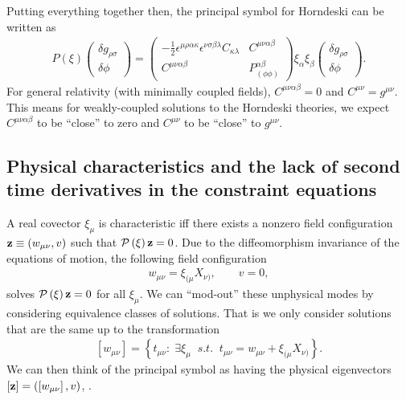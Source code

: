 \documentclass{ws-ijmpd}
\begin{document}
Putting everything together then, the principal symbol for Horndeski
can be written as
\begin{align}
   P\left(\xi\right)
   \begin{pmatrix}
      \delta g_{\rho\sigma}
      \\
      \delta\phi
   \end{pmatrix}
   =
   \begin{pmatrix}
      -
      \frac{1}{2}
      \epsilon^{\mu\rho\alpha\kappa}
      \epsilon^{\nu\sigma\beta\lambda}
      C_{\kappa\lambda}
      &
      C^{\mu\nu\alpha\beta}
      \\
      C^{\mu\nu\alpha\beta}
      &
      P^{\alpha\beta}_{(\phi\phi)}
   \end{pmatrix}
   \xi_{\alpha}\xi_{\beta}
   \begin{pmatrix}
      \delta g_{\rho\sigma}
      \\
      \delta\phi
   \end{pmatrix}
   .
\end{align}
For general relativity (with minimally coupled fields),
$C^{\mu\nu\alpha\beta}=0$ and $C^{\mu\nu}=g^{\mu\nu}$. 
This means for weakly-coupled solutions to the Horndeski theories,
we expect $C^{\mu\nu\alpha\beta}$ to be ``close'' to zero
and $C^{\mu\nu}$ to be ``close'' to $g^{\mu\nu}$.
\subsection{Physical characteristics and the lack of
second time derivatives in the constraint equations
\label{sec:physical_characteristics}}
A real covector $\xi_{\mu}$ is characteristic iff there exists a
nonzero field configuration ${\bf z}\equiv(w_{\mu\nu},v)$ such that
$\mathcal{P}\left(\xi\right){\bf z}=0$.
Due to the diffeomorphism invariance of the equations of motion,
the following field configuration
\begin{align}
   w_{\mu\nu}
   =
   \xi_{(\mu}X_{\nu)}
   ,\qquad
   v
   =
   0
   ,
\end{align}
solves $\mathcal{P}\left(\xi\right){\bf z}=0$ for all $\xi_{\mu}$.
We can ``mod-out'' these unphysical modes by considering equivalence
classes of solutions. 
That is we only consider solutions that are the same
up to the transformation\cite{christodoulou2008mathematical}
\begin{align}
   \left[w_{\mu\nu}\right]
   =
   \left\{
      t_{\mu\nu}
      :
      \;
      \exists \xi_{\mu}
      \;
      \;
      s.t.
      \;
      \;
      t_{\mu\nu}
      =
      w_{\mu\nu}
      +
      \xi_{(\mu}X_{\nu)}
   \right\}
.
\end{align}
We can then think of the principal symbol as having 
the physical eigenvectors
$\left[{\bf z}\right]=\left(\left[w_{\mu\nu}\right],v\right)$, .
\end{document}
